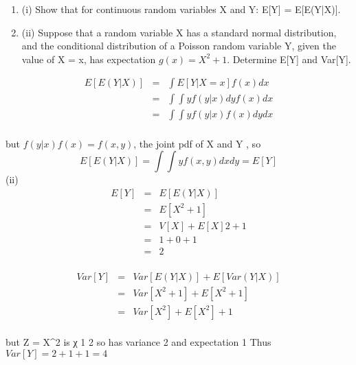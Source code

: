 \documentclass[a4paper,12pt]{article}
\begin{document}
\begin{enumerate}
\item 
(i) Show that for continuous random variables X and Y:
E[Y] = E[E(Y|X)].
\item (ii)
Suppose that a random variable X has a standard normal distribution, and the
conditional distribution of a Poisson random variable Y, given the value of
X = x, has expectation $g(x) = X^{2} + 1$.
Determine E[Y] and Var[Y].
\end{enumerate}

\newpage
\begin{eqnarray*}
E [ E ( Y | X )] &=& \int E [ Y | X = x ] f ( x ) dx\\
&=& \int \int yf ( y | x ) dy f ( x ) dx\\
&=& \int \int y f ( y | x ) f ( x ) dydx\\
\end{eqnarray*}

but $f ( y | x ) f ( x ) = f ( x , y )$, the joint pdf of X and Y , so
\[E [ E ( Y | X )] = \int \int y f ( x , y ) dxdy = E [ Y ]\]
(ii)
\begin{eqnarray*}
E [ Y ] &=& E [ E ( Y | X )] \\ 
&=& E [ X^{2} + 1] \\
&=& V [ X ] + { E [ X ]} 2 + 1 \\
&=& 1 + 0 + 1 \\ &=& 2
\\
\end{eqnarray*}

\begin{eqnarray*}
Var [ Y ] &=& Var [ E ( Y | X )] + E [ Var ( Y | X )] \\ 
&=& Var [ X^{2} + 1] + E [ X^{2} + 1]\\
&=& Var [ X^{2} ] + E [ X^{2} ] + 1\\
\end{eqnarray*}

but Z = X^{2} is χ 1 2 so has variance 2 and expectation 1
Thus $Var [ Y ] = 2 + 1 + 1 = 4$

\end{document}
